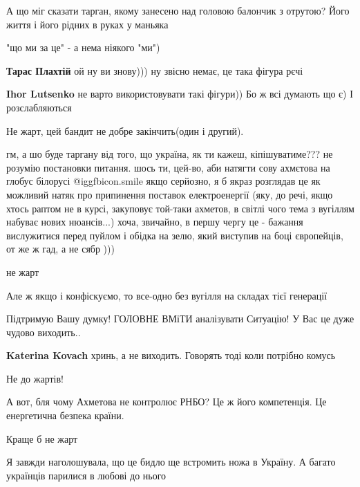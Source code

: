\begin{itemize}
А що міг сказати тарган, якому занесено над головою балончик з отрутою? Його
життя і його рідних в руках у маньяка

"що ми за це" - а нема ніякого "ми")

\begin{itemize} %
\textbf{Тарас Плахтій} ой ну ви знову))) ну звісно немає, це така фігура рєчі

\textbf{Ihor Lutsenko} не варто використовувати такі фігури)) Бо ж всі думають що є) І розслабляються
\end{itemize} %

Не жарт, цей бандит не добре закінчить(один і другий).



гм, а шо буде таргану від того, що україна, як ти кажеш, кіпішуватиме??? не
розумію постановки питання. шось ти, цей-во, аби натягти сову ахмєтова на
глобус білорусі  @igg{fbicon.smile}  якщо серйозно, я б якраз розглядав це як можливий натяк про
припинення поставок електроенергії (яку, до речі, якщо хтось раптом не в курсі,
закуповує той-таки ахметов, в світлі чого тема з вугіллям набуває нових
нюансів...) хоча, звичайно, в першу чергу це - бажання вислужитися перед пуйлом
і обідка на зелю, який виступив на боці європейців, от же ж гад, а не сябр )))

не жарт

Але ж якщо і конфіскуємо, то все-одно без вугілля на складах тієї генерації

Підтримую Вашу думку! ГОЛОВНЕ ВМіТИ аналізувати Ситуацію! У Вас це дуже чудово виходить..

\begin{itemize} %
\textbf{Katerina Kovach} хринь, а не виходить. Говорять тоді коли потрібно комусь
\end{itemize} %

Не до жартів!

А вот, бля чому Ахметова не контролює РНБО? Це ж його компетенція. Це енергетична безпека країни.

Краще б не жарт

Я завжди наголошувала, що це бидло ще встромить ножа в Україну. А багато українців парилися в любові до нього



\end{itemize}
